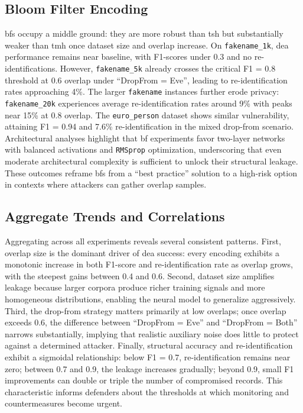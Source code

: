\documentclass[a4paper,11pt]{scrartcl}
\begin{document}
\subsection{Bloom Filter Encoding}
\ac{bf}s occupy a middle ground: they are more robust than \ac{tsh} but substantially weaker than \ac{tmh} once dataset size and overlap increase. On \texttt{fakename\_1k}, \ac{dea} performance remains near baseline, with F1-scores under 0.3 and no re-identifications. However, \texttt{fakename\_5k} already crosses the critical F1 = 0.8 threshold at 0.6 overlap under ``DropFrom = Eve'', leading to re-identification rates approaching 4\%. The larger \texttt{fakename} instances further erode privacy: \texttt{fakename\_20k} experiences average re-identification rates around 9\% with peaks near 15\% at 0.8 overlap. The \texttt{euro\_person} dataset shows similar vulnerability, attaining F1 = 0.94 and 7.6\% re-identification in the mixed drop-from scenario. Architectural analyses highlight that \ac{bf} experiments favor two-layer networks with balanced activations and \texttt{RMSprop} optimization, underscoring that even moderate architectural complexity is sufficient to unlock their structural leakage. These outcomes reframe \ac{bf}s from a ``best practice'' solution to a high-risk option in contexts where attackers can gather overlap samples.

\subsection{Aggregate Trends and Correlations}
Aggregating across all experiments reveals several consistent patterns. First, overlap size is the dominant driver of \ac{dea} success: every encoding exhibits a monotonic increase in both F1-score and re-identification rate as overlap grows, with the steepest gains between 0.4 and 0.6. Second, dataset size amplifies leakage because larger corpora produce richer training signals and more homogeneous distributions, enabling the neural model to generalize aggressively. Third, the drop-from strategy matters primarily at low overlaps; once overlap exceeds 0.6, the difference between ``DropFrom = Eve'' and ``DropFrom = Both'' narrows substantially, implying that realistic auxiliary noise does little to protect against a determined attacker. Finally, structural accuracy and re-identification exhibit a sigmoidal relationship: below F1 = 0.7, re-identification remains near zero; between 0.7 and 0.9, the leakage increases gradually; beyond 0.9, small F1 improvements can double or triple the number of compromised records. This characteristic informs defenders about the thresholds at which monitoring and countermeasures become urgent.
\end{document}
